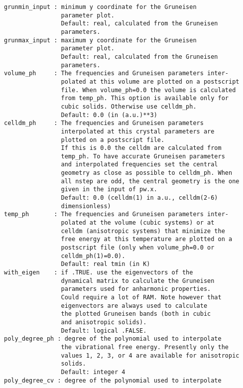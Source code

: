 \documentclass[12pt,a4paper,twoside]{report}
\begin{document}
\begin{verbatim}
grunmin_input : minimum y coordinate for the Gruneisen 
                parameter plot.
                Default: real, calculated from the Gruneisen 
                parameters.
grunmax_input : maximum y coordinate for the Gruneisen 
                parameter plot.
                Default: real, calculated from the Gruneisen 
                parameters.
volume_ph     : The frequencies and Gruneisen parameters inter-
                polated at this volume are plotted on a postscript 
                file. When volume_ph=0.0 the volume is calculated 
                from temp_ph. This option is available only for 
                cubic solids. Otherwise use celldm_ph.
                Default: 0.0 (in (a.u.)**3)
celldm_ph     : The frequencies and Gruneisen parameters 
                interpolated at this crystal parameters are 
                plotted on a postscript file. 
                If this is 0.0 the celldm are calculated from 
                temp_ph. To have accurate Gruneisen parameters 
                and interpolated frequencies set the central 
                geometry as close as possible to celldm_ph. When 
                all nstep are odd, the central geometry is the one 
                given in the input of pw.x.
                Default: 0.0 (celldm(1) in a.u., celldm(2-6) 
                dimensionless)
temp_ph       : The frequencies and Gruneisen parameters inter-
                polated at the volume (cubic systems) or at 
                celldm (anisotropic systems) that minimize the 
                free energy at this temperature are plotted on a 
                postscript file (only when volume_ph=0.0 or 
                celldm_ph(1)=0.0).
                Default: real tmin (in K)
with_eigen    : if .TRUE. use the eigenvectors of the 
                dynamical matrix to calculate the Gruneisen 
                parameters used for anharmonic properties. 
                Could require a lot of RAM. Note however that 
                eigenvectors are always used to calculate
                the plotted Gruneisen bands (both in cubic 
                and anisotropic solids).
                Default: logical .FALSE. 
poly_degree_ph : degree of the polynomial used to interpolate 
                the vibrational free energy. Presently only the 
                values 1, 2, 3, or 4 are available for anisotropic 
                solids. 
                Default: integer 4
poly_degree_cv : degree of the polynomial used to interpolate 

\end{verbatim}
\end{document}
